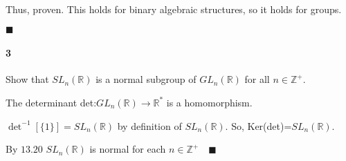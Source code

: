 \documentclass{article}
\newcommand\Z{\mathbb{Z}}
\newcommand\R{\mathbb{R}}
\begin{document}
Thus, proven. This holds for binary algebraic structures, so it holds
for groups.

$\blacksquare$

\paragraph{3} Show that $SL_n(\R)$ is a normal subgroup of $GL_n(\R)$
for all $n \in \Z^+$.


The determinant det:$GL_n(\R) \rightarrow \R^*$ is a
homomorphism.

$\det^{-1}[\{1\}] = SL_n(\R)$ by definition of $SL_n(\R)$.
So, Ker(det)=$SL_n(\R)$.

By $13.20$ $SL_n(\R)$ is normal for each $n \in \Z^+ \quad \blacksquare$
\end{document}
